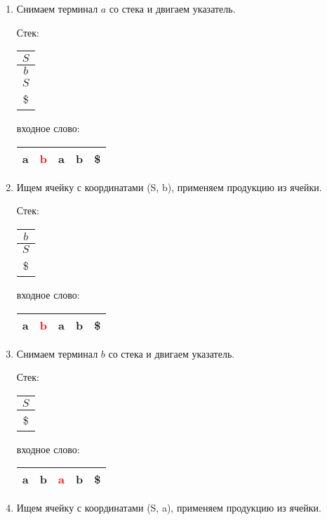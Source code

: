 \begin{example}
\begin{enumerate}
\item Снимаем терминал $a$ со стека и двигаем указатель.

    Стек: \,
    \begin{tabular}[c]{ |c| }
        \\ \hline
        $S$ \\ \hline
        $b$ \\ \hline
        $S$ \\ \hline
        \$ \\ \hline
    \end{tabular}
    \qquad  \qquad \qquad  \qquad входное слово: \,
    \begin{tabular}[c]{ |c|c|c|c|c| }
        \hline
        a & \textcolor{red}{b} & a & b & \$ \\ \hline
    \end{tabular}

\item Ищем ячейку с координатами (S, b), применяем продукцию из ячейки.

    Стек: \,
    \begin{tabular}[c]{ |c| }
        \\ \hline
        $b$ \\ \hline
        $S$ \\ \hline
        \$ \\ \hline
    \end{tabular}
    \qquad  \qquad \qquad  \qquad входное слово: \,
    \begin{tabular}[c]{ |c|c|c|c|c| }
        \hline
        a & \textcolor{red}{b} & a & b & \$ \\ \hline
    \end{tabular}

\item Снимаем терминал $b$ со стека и двигаем указатель.

    Стек: \,
    \begin{tabular}[c]{ |c| }
        \\ \hline
        $S$ \\ \hline
        \$ \\ \hline
    \end{tabular}
    \qquad  \qquad \qquad  \qquad входное слово: \,
    \begin{tabular}[c]{ |c|c|c|c|c| }
        \hline
        a & b & \textcolor{red}{a} & b & \$ \\ \hline
    \end{tabular}

  \item Ищем ячейку с координатами (S, a), применяем продукцию из ячейки.


\end{enumerate}
\end{example}
